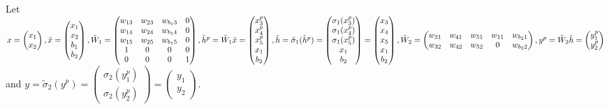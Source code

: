 \documentclass[a4paper, 12pt]{scrreprt} %
\begin{document}
\begin{myExample}
Let
$
x=\begin{pmatrix}	x_1 \\ x_2 \end{pmatrix},
\tilde{x}=\begin{pmatrix}
	x_1 \\ x_2 \\ b_1 \\ b_2
\end{pmatrix}, 
\tilde{W}_1 = \begin{pmatrix}
	w_{1 3} & w_{2 3} & w_{b_1 3} & 0 \\
	w_{1 4} & w_{2 4} & w_{b_1 4} & 0 \\
	w_{1 5} & w_{2 5} & w_{b_1 5} & 0 \\
	1 & 0 & 0 & 0 \\
	0 & 0 & 0 & 1
\end{pmatrix}, 
\tilde{h}^p = \tilde{W}_1 \tilde{x} = \begin{pmatrix}
	x_3^p \\ x_4^p \\ x_5^p \\ x_1 \\ b_2
\end{pmatrix}, \\
\tilde{h} = \tilde{\sigma}_1(\tilde{h}^p) = \begin{pmatrix}
	\sigma_1(x_3^p) \\ \sigma_1(x_4^p) \\ \sigma_1(x_5^p) \\ x_1 \\ b_2 
\end{pmatrix} = \begin{pmatrix}
	x_3 \\ x_4 \\ x_5 \\ x_1 \\ b_2
\end{pmatrix},
\tilde{W}_2 = \begin{pmatrix}
	w_{3 1} & w_{4 1} & w_{5 1} & w_{1 1} & w_{b_2 1}  \\
	w_{3 2} & w_{4 2} & w_{5 2} & 0 & w_{b_2 2}  
\end{pmatrix}, \\
y^p = \tilde{W}_2 \tilde{h} = \begin{pmatrix}
	y_1^p \\ y_2^p
\end{pmatrix}$ and $
y = \tilde{\sigma}_2(y^p) = \begin{pmatrix}
	\sigma_2(y_1^p) \\ \sigma_2(y_2^p)
\end{pmatrix} = \begin{pmatrix}
	y_1 \\ y_2
\end{pmatrix}
$.


\end{myExample}
\end{document}
